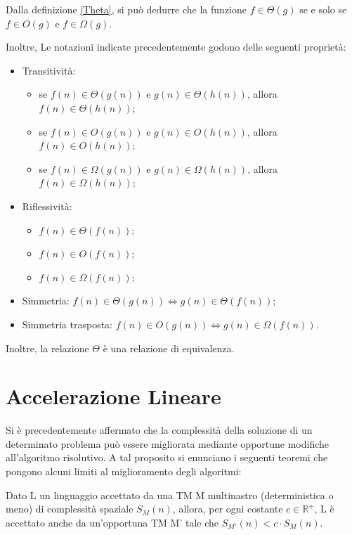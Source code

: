   \noindent Dalla definizione \ref{Theta}, si può dedurre che la funzione \(f\in\Theta(g)\) se e solo se \(f\in O(g)\) e \(f\in \Omega(g)\).

  Inoltre, Le notazioni indicate precedentemente godono delle seguenti proprietà:
  \begin{itemize}
    \item Transitività:
    \begin{itemize}
      \item se \(f(n)\in\Theta(g(n))\) e \(g(n)\in\Theta(h(n))\), allora \(f(n)\in\Theta(h(n))\);
      \item se \(f(n)\in O(g(n))\) e \(g(n)\in O(h(n))\), allora \(f(n)\in O(h(n))\);
      \item se \(f(n)\in\Omega(g(n))\) e \(g(n)\in\Omega(h(n))\), allora \(f(n)\in\Omega(h(n))\);
    \end{itemize}
    \item Riflessività:
    \begin{itemize}
      \item \(f(n)\in\Theta(f(n))\);
      \item \(f(n)\in O(f(n))\);
      \item \(f(n)\in\Omega(f(n))\);
    \end{itemize}
    \item Simmetria: \(f(n)\in\Theta(g(n))\Leftrightarrow g(n)\in\Theta(f(n))\);
    \item Simmetria trasposta: \(f(n)\in O(g(n))\Leftrightarrow g(n)\in\Omega(f(n))\).
  \end{itemize}

  Inoltre, la relazione \(\Theta\) è una relazione di equivalenza.

  \section{Accelerazione Lineare}
  Si è precedentemente affermato che la complessità della soluzione di un determinato problema può essere migliorata mediante opportune modifiche all'algoritmo risolutivo. A tal proposito si enunciano i seguenti teoremi che pongono alcuni limiti al miglioramento degli algoritmi:

  \begin{theorem}
    Dato L un linguaggio accettato da una TM M multinastro (deterministica o meno) di complessità spaziale \({S}_M(n)\), allora, per ogni costante \(c\in \mathbb{R}^+\), L è accettato anche da un'opportuna TM M' tale che \({S}_{M'}(n)<c\cdot{S}_M(n)\).
  \end{theorem}

